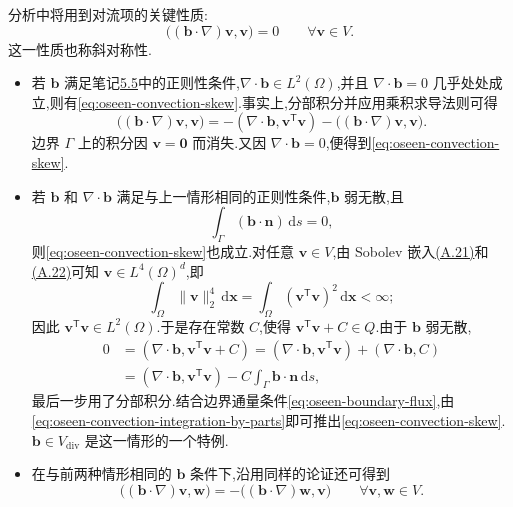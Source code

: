 \begin{note}[对流项的斜对称性]\label{note:oseen-skew-symmetry}
分析中将用到对流项的关键性质:
\begin{equation}\label{eq:oseen-convection-skew}
  \bigl((\bm{b}\cdot\nabla)\bm{v},\bm{v}\bigr)=0
  \qquad\forall\bm{v}\in V.
\end{equation}
这一性质也称斜对称性.
\begin{itemize}
  \item 若 $\bm{b}$ 满足笔记\hyperref[note:oseen-minimal-regularity]{5.5}中的正则性条件,$\nabla\cdot\bm{b}\in L^2(\Omega)$,并且 $\nabla\cdot\bm{b}=0$ 几乎处处成立,则有\cref{eq:oseen-convection-skew}.事实上,分部积分并应用乘积求导法则可得
  \begin{equation}\label{eq:oseen-convection-integration-by-parts}
    \bigl((\bm{b}\cdot\nabla)\bm{v},\bm{v}\bigr)
    =-(\nabla\cdot\bm{b},\bm{v}^{\mathsf T}\bm{v})
      -\bigl((\bm{b}\cdot\nabla)\bm{v},\bm{v}\bigr).
  \end{equation}
  边界 $\Gamma$ 上的积分因 $\bm{v}=\bm{0}$ 而消失.又因 $\nabla\cdot\bm{b}=0$,便得到\cref{eq:oseen-convection-skew}.
  \item 若 $\bm{b}$ 和 $\nabla\cdot\bm{b}$ 满足与上一情形相同的正则性条件,$\bm{b}$ 弱无散,且
  \begin{equation}\label{eq:oseen-boundary-flux}
    \int_\Gamma(\bm{b}\cdot\bm{n})\,\mathrm{d}s=0,
  \end{equation}
  则\cref{eq:oseen-convection-skew}也成立.对任意 $\bm{v}\in V$,由 Sobolev 嵌入\hyperref[eq:appendix-a-21]{(A.21)}和\hyperref[eq:appendix-a-22]{(A.22)}可知 $\bm{v}\in L^4(\Omega)^d$,即
  \[
    \int_\Omega\|\bm{v}\|_2^4\,\mathrm{d}\bm{x}
      =\int_\Omega(\bm{v}^{\mathsf T}\bm{v})^2\,\mathrm{d}\bm{x}<\infty;
  \]
  因此 $\bm{v}^{\mathsf T}\bm{v}\in L^2(\Omega)$.于是存在常数 $C$,使得 $\bm{v}^{\mathsf T}\bm{v}+C\in Q$.由于 $\bm{b}$ 弱无散,
  \begin{equation}\label{eq:oseen-weak-divergence-identity}
  \begin{aligned}
    0&=(\nabla\cdot\bm{b},\bm{v}^{\mathsf T}\bm{v}+C)
      =(\nabla\cdot\bm{b},\bm{v}^{\mathsf T}\bm{v})
        +(\nabla\cdot\bm{b},C)\\
     &=(\nabla\cdot\bm{b},\bm{v}^{\mathsf T}\bm{v})
        -C\int_\Gamma\bm{b}\cdot\bm{n}\,\mathrm{d}s,
  \end{aligned}
  \end{equation}
  最后一步用了分部积分.结合边界通量条件\cref{eq:oseen-boundary-flux},由\cref{eq:oseen-convection-integration-by-parts}即可推出\cref{eq:oseen-convection-skew}.$\bm{b}\in V_{\mathrm{div}}$ 是这一情形的一个特例.
  \item 在与前两种情形相同的 $\bm{b}$ 条件下,沿用同样的论证还可得到
  \begin{equation}\label{eq:oseen-convection-skew-adjoint}
    \bigl((\bm{b}\cdot\nabla)\bm{v},\bm{w}\bigr)
      =-\bigl((\bm{b}\cdot\nabla)\bm{w},\bm{v}\bigr)
      \qquad\forall\bm{v},\bm{w}\in V.
  \end{equation}
\end{itemize}
\end{note}

